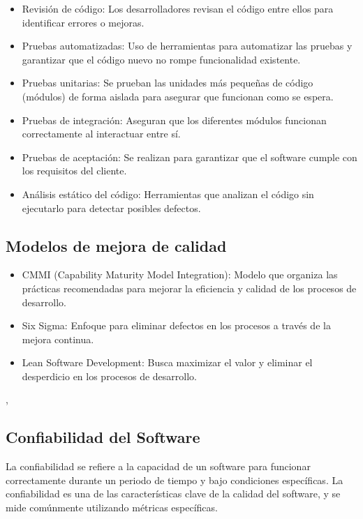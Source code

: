 \documentclass[12pt]{article}
\begin{document}
\begin{itemize}
    \item Revisión de código: Los desarrolladores revisan el código entre ellos para identificar errores o mejoras.
    \item Pruebas automatizadas: Uso de herramientas para automatizar las pruebas y garantizar que el código nuevo no rompe funcionalidad existente.
    \item Pruebas unitarias: Se prueban las unidades más pequeñas de código (módulos) de forma aislada para asegurar que funcionan como se espera.
    \item Pruebas de integración: Aseguran que los diferentes módulos funcionan correctamente al interactuar entre sí.
    \item Pruebas de aceptación: Se realizan para garantizar que el software cumple con los requisitos del cliente.
    \item Análisis estático del código: Herramientas que analizan el código sin ejecutarlo para detectar posibles defectos.
\end{itemize}

\subsection*{Modelos de mejora de calidad}
\begin{itemize}
    \item CMMI (Capability Maturity Model Integration): Modelo que organiza las prácticas recomendadas para mejorar la eficiencia y calidad de los procesos de desarrollo.
    \item Six Sigma: Enfoque para eliminar defectos en los procesos a través de la mejora continua.
    \item Lean Software Development: Busca maximizar el valor y eliminar el desperdicio en los procesos de desarrollo.

\end{itemize}

\cite{icariatechnologyCalidadSoftware}, \cite{saludelectronicaCalidadSoftware}

\subsection*{Confiabilidad del Software}
La confiabilidad se refiere a la capacidad de un software para funcionar correctamente durante un periodo de tiempo y bajo condiciones específicas. La confiabilidad es una de las características clave de la calidad del software, y se mide comúnmente utilizando métricas específicas.
\end{document}
